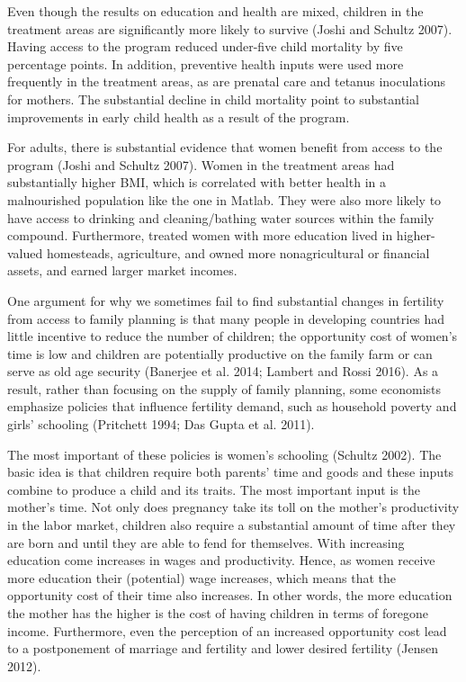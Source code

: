 \documentclass[]{article}
\begin{document}
Even though the results on education and health are mixed, children in the treatment areas are significantly more likely to survive (Joshi and Schultz 2007). Having access to the program reduced under-five child mortality by five percentage points. In addition, preventive health inputs were used more frequently in the treatment areas, as are prenatal care and tetanus inoculations for mothers. The substantial decline in child mortality point to substantial improvements in early child health as a result of the program.

For adults, there is substantial evidence that women benefit from access to the program (Joshi and Schultz 2007). Women in the treatment areas had substantially higher BMI, which is correlated with better health in a malnourished population like the one in Matlab. They were also more likely to have access to drinking and cleaning/bathing water sources within the family compound. Furthermore, treated women with more education lived in higher-valued homesteads, agriculture, and owned more nonagricultural or financial assets, and earned larger market incomes.

One argument for why we sometimes fail to find substantial changes in fertility from access to family planning is that many people in developing countries had little incentive to reduce the number of children; the opportunity cost of women's time is low and children are potentially productive on the family farm or can serve as old age security (Banerjee et al. 2014; Lambert and Rossi 2016). As a result, rather than focusing on the supply of family planning, some economists emphasize policies that influence fertility demand, such as household poverty and girls' schooling (Pritchett 1994; Das Gupta et al. 2011).

The most important of these policies is women's schooling (Schultz 2002). The basic idea is that children require both parents' time and goods and these inputs combine to produce a child and its traits. The most important input is the mother's time. Not only does pregnancy take its toll on the mother's productivity in the labor market, children also require a substantial amount of time after they are born and until they are able to fend for themselves. With increasing education come increases in wages and productivity. Hence, as women receive more education their (potential) wage increases, which means that the opportunity cost of their time also increases. In other words, the more education the mother has the higher is the cost of having children in terms of foregone income. Furthermore, even the perception of an increased opportunity cost lead to a postponement of marriage and fertility and lower desired fertility (Jensen 2012).
\end{document}
